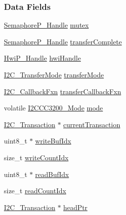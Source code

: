 \subsubsection*{Data Fields}
\begin{DoxyCompactItemize}
\item 
\hyperlink{_semaphore_p_8h_a7f34865f33e666455692544e5f12d1f2}{Semaphore\+P\+\_\+\+Handle} \hyperlink{struct_i2_c_c_c3200___object_a7e7772eb01292cc0b62c4581e3820019}{mutex}
\item 
\hyperlink{_semaphore_p_8h_a7f34865f33e666455692544e5f12d1f2}{Semaphore\+P\+\_\+\+Handle} \hyperlink{struct_i2_c_c_c3200___object_acb48c5a20c3eabff5c8598fff3101322}{transfer\+Complete}
\item 
\hyperlink{_hwi_p_8h_a7dd325ff62af296374efc6d317f5e368}{Hwi\+P\+\_\+\+Handle} \hyperlink{struct_i2_c_c_c3200___object_a73cf461294edd31cba7be186931788f0}{hwi\+Handle}
\item 
\hyperlink{_i2_c_8h_a39f3b9340fc4ee241b0d2da9b2841c26}{I2\+C\+\_\+\+Transfer\+Mode} \hyperlink{struct_i2_c_c_c3200___object_a1859cc58f64d35c9f1e1ea7dc3299d07}{transfer\+Mode}
\item 
\hyperlink{_i2_c_8h_aa7389002843eba77425c73b441358fd1}{I2\+C\+\_\+\+Callback\+Fxn} \hyperlink{struct_i2_c_c_c3200___object_a7255d478cb8cec42ab567d1dd21366a4}{transfer\+Callback\+Fxn}
\item 
volatile \hyperlink{_i2_c_c_c3200_8h_aecba715487712a8b525074b7b93e940b}{I2\+C\+C\+C3200\+\_\+\+Mode} \hyperlink{struct_i2_c_c_c3200___object_a166bb74341dd72ba2984ccb91c8671d4}{mode}
\item 
\hyperlink{struct_i2_c___transaction}{I2\+C\+\_\+\+Transaction} $\ast$ \hyperlink{struct_i2_c_c_c3200___object_af58599ee3172875cd89bb8fc361105a0}{current\+Transaction}
\item 
uint8\+\_\+t $\ast$ \hyperlink{struct_i2_c_c_c3200___object_a1fcf5dd76fa070d4b10aa8c44d708e94}{write\+Buf\+Idx}
\item 
size\+\_\+t \hyperlink{struct_i2_c_c_c3200___object_aef05aaf02f1ff9b559b0baaefda50998}{write\+Count\+Idx}
\item 
uint8\+\_\+t $\ast$ \hyperlink{struct_i2_c_c_c3200___object_a522fae305e0654af93f851f42505eb01}{read\+Buf\+Idx}
\item 
size\+\_\+t \hyperlink{struct_i2_c_c_c3200___object_a9f108cb9fd742f7b4319551fdca5c9d9}{read\+Count\+Idx}
\item 
\hyperlink{struct_i2_c___transaction}{I2\+C\+\_\+\+Transaction} $\ast$ \hyperlink{struct_i2_c_c_c3200___object_a6d9628fb1e8e8e8a56031749fd65b7cb}{head\+Ptr}

\end{DoxyCompactItemize}
